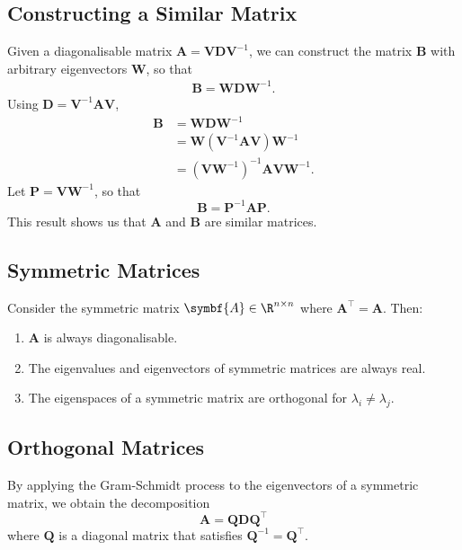 \documentclass{article}
\begin{document}
\subsection{Constructing a Similar Matrix}
Given a diagonalisable matrix \(\symbf{A} = \symbf{V}\symbf{D}\symbf{V}^{-1}\), we can construct the matrix \(\symbf{B}\) with arbitrary eigenvectors
\(\symbf{W}\), so that
\begin{align*}
    \symbf{B} = \symbf{W} \symbf{D} \symbf{W}^{-1}.
\end{align*}
Using \(\symbf{D} = \symbf{V}^{-1} \symbf{A} \symbf{V}\),
\begin{align*}
    \symbf{B} & = \symbf{W} \symbf{D} \symbf{W}^{-1}                                               \\
              & = \symbf{W} \left( \symbf{V}^{-1} \symbf{A} \symbf{V} \right) \symbf{W}^{-1}       \\
              & = \left( \symbf{V} \symbf{W}^{-1} \right)^{-1} \symbf{A} \symbf{V} \symbf{W}^{-1}.
\end{align*}
Let \(\symbf{P} = \symbf{V} \symbf{W}^{-1}\), so that
\begin{equation*}
    \symbf{B} = \symbf{P}^{-1} \symbf{A} \symbf{P}.
\end{equation*}
This result shows us that \(\symbf{A}\) and \(\symbf{B}\) are similar matrices.
\subsection{Symmetric Matrices}
Consider the symmetric matrix \(\symbf{A}\in\R^{n \times n}\) where \(\symbf{A}^\top = \symbf{A}\).
Then:
\begin{enumerate}
    \item \(\symbf{A}\) is always diagonalisable.
    \item The eigenvalues and eigenvectors of symmetric matrices are always real.
    \item The eigenspaces of a symmetric matrix are orthogonal for \(\lambda_i \neq \lambda_j\).
\end{enumerate}
\subsection{Orthogonal Matrices}
By applying the Gram-Schmidt process to the eigenvectors of a symmetric matrix, we obtain the decomposition
\begin{equation*}
    \symbf{A} = \symbf{Q} \symbf{D} \symbf{Q}^\top
\end{equation*}
where \(\symbf{Q}\) is a diagonal matrix that satisfies \(\symbf{Q}^{-1} = \symbf{Q}^\top\).
\end{document}
